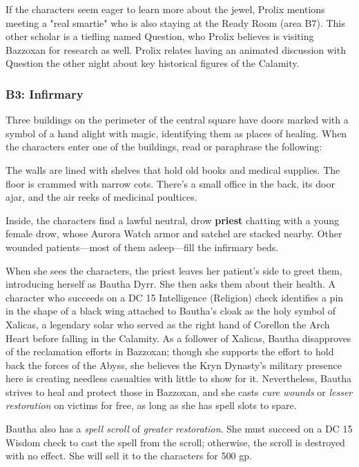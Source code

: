 \documentclass[a4paper, 11pt, bg=full, twocolumn, nooutline]{dndbook}
\begin{document}
If the characters seem eager to learn more about the jewel, Prolix mentions meeting a "real smartie" who is also staying at the Ready Room (area B7). This other scholar is a tiefling named Question, who Prolix believes is visiting Bazzoxan for research as well. Prolix relates having an animated discussion with Question the other night about key historical figures of the Calamity.

\subsubsection{B3: Infirmary}

Three buildings on the perimeter of the central square have doors marked with a symbol of a hand alight with magic, identifying them as places of healing. When the characters enter one of the buildings, read or paraphrase the following:

\begin{DndReadAloud}
The walls are lined with shelves that hold old books and medical supplies. The floor is crammed with narrow cots. There's a small office in the back, its door ajar, and the air reeks of medicinal poultices.
\end{DndReadAloud}

Inside, the characters find a lawful neutral, drow \textbf{priest} chatting with a young female drow, whose Aurora Watch armor and satchel are stacked nearby. Other wounded patients---most of them asleep---fill the infirmary beds.

When she sees the characters, the priest leaves her patient's side to greet them, introducing herself as Bautha Dyrr. She then asks them about their health. A character who succeeds on a DC 15 Intelligence (Religion) check identifies a pin in the shape of a black wing attached to Bautha's cloak as the holy symbol of Xalicas, a legendary solar who served as the right hand of Corellon the Arch Heart before falling in the Calamity. As a follower of Xalicas, Bautha disapproves of the reclamation efforts in Bazzoxan; though she supports the effort to hold back the forces of the Abyss, she believes the Kryn Dynasty's military presence here is creating needless casualties with little to show for it. Nevertheless, Bautha strives to heal and protect those in Bazzoxan, and she casts \textit{cure wounds} or \textit{lesser restoration} on victims for free, as long as she has spell slots to spare.

Bautha also has a \textit{spell scroll} of \textit{greater restoration}. She must succeed on a DC 15 Wisdom check to cast the spell from the scroll; otherwise, the scroll is destroyed with no effect. She will sell it to the characters for 500 gp.
\end{document}

